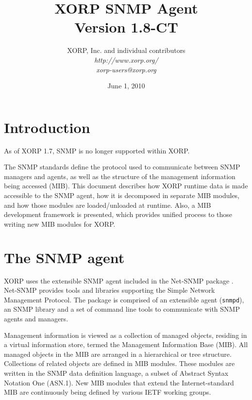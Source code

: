 \documentclass[11pt]{article}
\begin{document}
\title{XORP SNMP Agent \\
\vspace{1ex}
Version 1.8-CT}
\author{ XORP, Inc. and individual contributors		\\
         {\it http://www.xorp.org/}			\\
	 {\it xorp-users@xorp.org}
}
\date{June 1, 2010}

\maketitle


\section{Introduction}

As of XORP 1.7, SNMP is no longer supported within XORP.

The SNMP standards \cite{STD0062} define the protocol used to communicate
between SNMP managers and agents, as well as the structure of the management
information being accessed (MIB).  This document describes how XORP runtime data
is made accessible to the SNMP agent, how it is decomposed in separate MIB
modules, and how those modules are loaded/unloaded at runtime.  Also, a MIB
development framework is presented, which provides unified process to those
writing new MIB modules for XORP.

\section{The SNMP agent}

XORP uses the extensible SNMP agent included in the Net-SNMP package
\cite{net-snmp}.  Net-SNMP provides tools and libraries supporting the Simple
Network Management Protocol.  The package is comprised of an extensible agent
(\texttt{snmpd}), an SNMP library and a set of command line tools to
communicate with SNMP agents and managers. 

Management information is viewed as a collection of managed objects, residing
in a virtual information store, termed the Management Information Base (MIB).
All managed objects in the MIB are arranged in a hierarchical or tree
structure.  Collections of related objects are defined in MIB modules.  These
modules are written in the SNMP data definition language, a subset of Abstract
Syntax Notation One (ASN.1).  New MIB modules that extend the Internet-standard
MIB are continuously being defined by various IETF working groups.  
\end{document}
